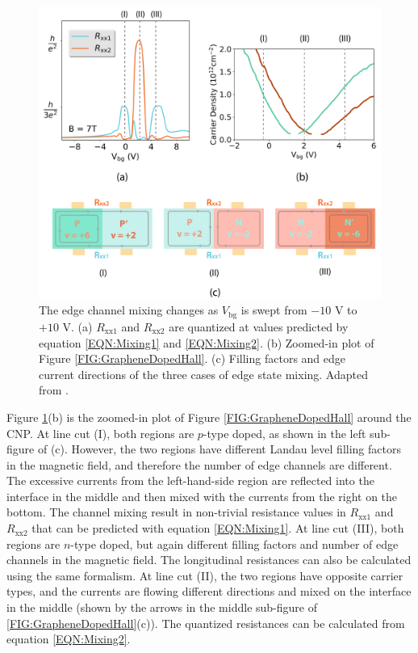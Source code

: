 \documentclass[pdflatex, sectionletters, 12pt]{pittetd}    %
\begin{document}
\begin{figure}[p]
	\centering
	\includegraphics[width=1.0\textwidth]{Drawing/EdgeChannels.pdf}
	\caption{The edge channel mixing changes as $V_\mathrm{bg}$ is swept from $-10$ V to $+10$ V. (a) $R_\mathrm{xx1}$ and $R_\mathrm{xx2}$ are quantized at values predicted by equation \ref{EQN:Mixing1} and \ref{EQN:Mixing2}. (b) Zoomed-in plot of Figure \ref{FIG:GrapheneDopedHall}. (c) Filling factors and edge current directions of the three cases of edge state mixing. Adapted from \cite{li2019reconfigurable}.}
	\label{FIG:EdgeChannels}
\end{figure}

Figure \ref{FIG:EdgeChannels}(b) is the zoomed-in plot of Figure \ref{FIG:GrapheneDopedHall} around the CNP. At line cut (I), both regions are $p$-type doped, as shown in the left sub-figure of (c). However, the two regions have different Landau level filling factors in the magnetic field, and therefore the number of edge channels are different. The excessive currents from the left-hand-side region are reflected into the interface in the middle and then mixed with the currents from the right on the bottom. The channel mixing result in non-trivial resistance values in $R_\mathrm{xx1}$ and $R_\mathrm{xx2}$ that can be predicted with equation \ref{EQN:Mixing1}. At line cut (III), both regions are $n$-type doped, but again different filling factors and number of edge channels in the magnetic field. The longitudinal resistances can also be calculated using the same formalism. At line cut (II), the two regions have opposite carrier types, and the currents are flowing different directions and mixed on the interface in the middle (shown by the arrows in the middle sub-figure of \ref{FIG:GrapheneDopedHall}(c)). The quantized resistances can be calculated from equation \ref{EQN:Mixing2}.
\end{document}
